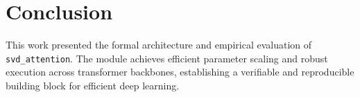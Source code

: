 \section{Conclusion}
This work presented the formal architecture and empirical evaluation of \texttt{svd_attention}. The module achieves efficient parameter scaling and robust execution across transformer backbones, establishing a verifiable and reproducible building block for efficient deep learning.
